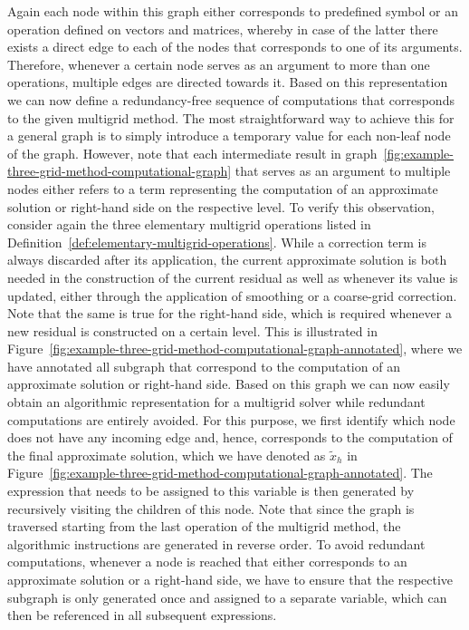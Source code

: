 Again each node within this graph either corresponds to predefined symbol or an operation defined on vectors and matrices, whereby in case of the latter there exists a direct edge to each of the nodes that corresponds to one of its arguments.  
Therefore, whenever a certain node serves as an argument to more than one operations, multiple edges are directed towards it.
Based on this representation we can now define a redundancy-free sequence of computations that corresponds to the given multigrid method.
The most straightforward way to achieve this for a general graph is to simply introduce a temporary value for each non-leaf node of the graph.
However, note that each intermediate result in graph~\ref{fig:example-three-grid-method-computational-graph} that serves as an argument to multiple nodes either refers to a term representing the computation of an approximate solution or right-hand side on the respective level.
To verify this observation, consider again the three elementary multigrid operations listed in Definition~\ref{def:elementary-multigrid-operations}.
While a correction term is always discarded after its application, the current approximate solution is both needed in the construction of the current residual as well as whenever its value is updated, either through the application of smoothing or a coarse-grid correction.
Note that the same is true for the right-hand side, which is required whenever a new residual is constructed on a certain level.
This is illustrated in Figure~\ref{fig:example-three-grid-method-computational-graph-annotated}, where we have annotated all subgraph that correspond to the computation of an approximate solution or right-hand side.
Based on this graph we can now easily obtain an algorithmic representation for a multigrid solver while redundant computations are entirely avoided.
For this purpose, we first identify which node does not have any incoming edge and, hence, corresponds to the computation of the final approximate solution, which we have denoted as $\tilde{x}_h$ in Figure~\ref{fig:example-three-grid-method-computational-graph-annotated}.
The expression that needs to be assigned to this variable is then generated by recursively visiting the children of this node.
Note that since the graph is traversed starting from the last operation of the multigrid method, the algorithmic instructions are generated in reverse order. 
To avoid redundant computations, whenever a node is reached that either corresponds to an approximate solution or a right-hand side, we have to ensure that the respective subgraph is only generated once and assigned to a separate variable, which can then be referenced in all subsequent expressions.
